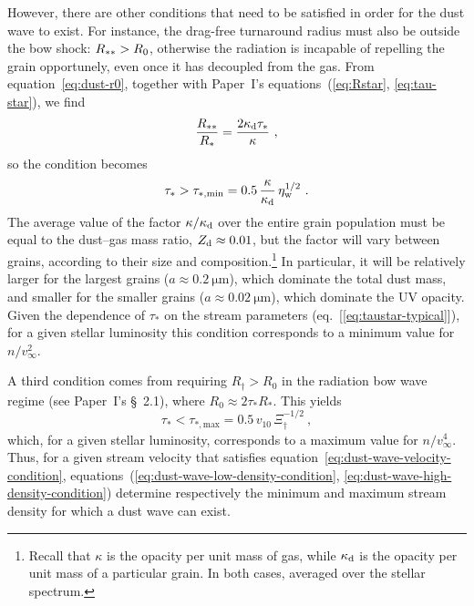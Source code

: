 However, there are other conditions that need to be satisfied in order
for the dust wave to exist.  For instance, the drag-free turnaround
radius must also be outside the bow shock: \(R_{**} > R_0\),
otherwise the radiation is incapable of repelling the grain
opportunely, even once it has decoupled from the gas.  From
equation~\eqref{eq:dust-r0}, together with Paper~I's
equations~(\ref{eq:Rstar}, \ref{eq:tau-star}),
we find
\begin{equation}
  \label{eq:Rstarstar-over-Rstar}
  \frac{R_{**}}{R_*} = \frac{2 \kappa_{\text{d}} \tau_*}{\kappa} \ , 
\end{equation}
so the condition becomes
\begin{equation}
  \label{eq:dust-wave-low-density-condition}
  \tau_* >  \tau_{*,\text{min}} = 0.5\, \frac{\kappa}{\kappa_{\text{d}}}\, \eta_{\text{w}}^{1/2} 
  \ . 
\end{equation}
The average value of the factor \(\kappa / \kappa_{\text{d}}\) over the entire grain
population must be equal to the dust--gas mass ratio,
\(Z_{\text{d}} \approx 0.01\), but the factor will vary between grains, according
to their size and composition.\footnote{%
  Recall that \(\kappa\) is the opacity per unit mass of gas, while
  \(\kappa_{\text{d}}\) is the opacity per unit mass of a particular grain. In
  both cases, averaged over the stellar spectrum.} %
In particular, it will be relatively larger for the largest grains
(\(a \approx \SI{0.2}{\um}\)), which dominate the total dust mass, and
smaller for the smaller grains (\(a \approx \SI{0.02}{\um}\)), which
dominate the UV opacity.  Given the dependence of \(\tau_*\) on the
stream parameters (eq.~[\ref{eq:taustar-typical}]),
for a given
stellar luminosity this condition corresponds to a minimum value for
\(n / v_\infty^2\).

A third condition comes from requiring \(R_\dag > R_0\) in the radiation
bow wave regime (see Paper~I's \S~2.1),
where
\(R_0 \approx 2 \tau_* R_*\).  This yields
\begin{equation}
  \label{eq:dust-wave-high-density-condition}
  \tau_* < \tau_{*,\text{max}} = 0.5\, v_{10}\, \Xi_\dag^{-1/2} \ , 
\end{equation}
which, for a given stellar luminosity, corresponds to a maximum value
for \(n / v_\infty^4\).  Thus, for a given stream velocity that satisfies
equation~\eqref{eq:dust-wave-velocity-condition},
equations~(\ref{eq:dust-wave-low-density-condition},
\ref{eq:dust-wave-high-density-condition}) determine respectively the
minimum and maximum stream density for which a dust wave can exist.   

